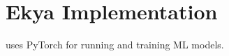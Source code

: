 \section{Ekya Implementation}
\label{sec:system}







\name uses PyTorch \cite{pytorch} for running and training ML models. 

